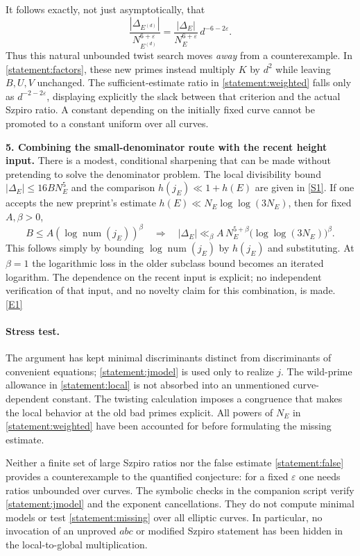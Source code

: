 \documentclass[11pt,a4paper]{article}
\newcommand{\sref}[2]{\hyperlink{source:#1:#2}{[S#2]}}
\newcommand{\eref}[2]{\hyperlink{extra:#1:#2}{[E#2]}}
\numberwithin{equation}{section}
\begin{document}
It follows exactly, not just asymptotically, that
\begin{equation}\label{statement:twist-ratio}
 \frac{|\Delta_{E^{(d)}}|}{N_{E^{(d)}}^{6+\varepsilon}}
 =\frac{|\Delta_E|}{N_E^{6+\varepsilon}}\,d^{-6-2\varepsilon}.
\end{equation}
Thus this natural unbounded twist search moves \emph{away} from a
counterexample. In \eqref{statement:factors}, these new primes instead multiply
$K$ by $d^2$ while leaving $B,U,V$ unchanged. The sufficient-estimate ratio
in \eqref{statement:weighted} falls only as $d^{-2-2\varepsilon}$, displaying
explicitly the slack between that criterion and the actual Szpiro ratio.
A constant depending on the initially fixed curve cannot be promoted to a
constant uniform over all curves.

\medskip
\textbf{5. Combining the small-denominator route with the recent height input.}
There is a modest, conditional sharpening that can be made without pretending
to solve the denominator problem. The local divisibility bound
$|\Delta_E|\leq16 B N_E^5$ and the comparison
$h(j_E)\ll1+h(E)$ are given in \sref{statement}{1}.
If one accepts the new preprint's estimate
$h(E)\ll N_E\log\log(3N_E)$, then for fixed $A,\beta>0$,
\[
 B\leq A(\log\operatorname{num}(j_E))^\beta
 \quad\Longrightarrow\quad
 |\Delta_E|\ll_\beta A\,
 N_E^{5+\beta}\bigl(\log\log(3N_E)\bigr)^\beta.
\]
This follows simply by bounding $\log\operatorname{num}(j_E)$ by $h(j_E)$
and substituting. At $\beta=1$ the logarithmic loss in the older subclass
bound becomes an iterated logarithm. The dependence on the recent input is
explicit; no independent verification of that input, and no novelty claim
for this combination, is made. \eref{statement}{1}

\paragraph{Stress test.}
The argument has kept minimal discriminants distinct from discriminants of
convenient equations; \eqref{statement:jmodel} is used only to realize $j$.
The wild-prime allowance in \eqref{statement:local} is not absorbed into an
unmentioned curve-dependent constant. The twisting calculation imposes a
congruence that makes the local behavior at the old bad primes explicit.
All powers of $N_E$ in \eqref{statement:weighted} have been accounted for before
formulating the missing estimate.

Neither a finite set of large Szpiro ratios nor the false estimate
\eqref{statement:false} provides a counterexample to the quantified conjecture:
for a fixed $\varepsilon$ one needs ratios unbounded over curves. The symbolic
checks in the companion script verify \eqref{statement:jmodel} and the exponent
cancellations. They do not compute minimal models or test
\eqref{statement:missing} over all elliptic curves. In particular, no invocation
of an unproved $abc$ or modified Szpiro statement has been hidden in the
local-to-global multiplication.
\end{document}
